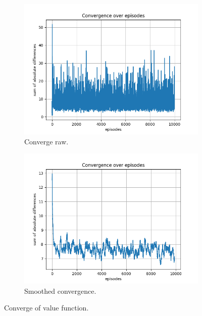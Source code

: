 \documentclass{assignment}
\begin{document}
\begin{figure}[H]
    \begin{subfigure}{0.5\textwidth}
        \includegraphics[width=\textwidth]{figures/convergence_q/epsilon_sweep/convergence_Q_alpha_0.1_gamma_0.95_epislon_0.0.png}
    \caption{Converge raw.}
    \end{subfigure}\hfill
    \begin{subfigure}{0.5\textwidth}
        \includegraphics[width=\textwidth]{figures/convergence_q/epsilon_sweep/convergence_Q_smoothed_alpha_0.1_gamma_0.95_epislon_0.0.png}
    \caption{Smoothed convergence.}
    \end{subfigure}
    \caption{Converge of value function.}
    \label{fig:epsilon_0.0_q_learning_convergence}
\end{figure}
\end{document}
